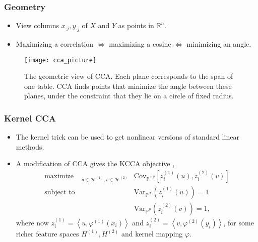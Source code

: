 \documentclass[10pt]{beamer}\usepackage[]{graphicx}\usepackage[]{color}
\def\reals{\mathbb{R}} %
\def\mrm#1{\mathrm{#1}}
\def\P{\mathbb{P}} %
\def\Cov{\mrm{Cov}} %
\def\Covsubarg#1#2{\Cov_{#1}\left[{#2}\right]}
\def\Var{\mrm{Var}}
\def\Varsubarg#1#2{\Var_{#1}\left(#2\right)}
\providecommand{\maximize}{\mathop\mathrm{maximize\quad}} %
\newcommand{\X}{\mathcal{X}}
\newcommand{\Y}{\mathcal{Y}}
\begin{document}
\begin{frame}
  \frametitle{Geometry}
  \begin{itemize}
  \item View columns $x_{\cdot j}, y_{\cdot j}$ of $X$ and $Y$ as points
    in $\reals^{n}$.
  \item Maximizing a correlation $\iff$ maximizing a cosine $\iff$ minimizing
    an angle.
  \end{itemize}
  \begin{figure}
    \texttt{[image: cca\_picture]}
    \caption{The geometric view of CCA. Each plane corresponds to the span of
      one table. CCA finds points that minimize the angle between these planes,
      under the constraint that they lie on a circle of fixed radius.}
  \end{figure}
\end{frame}

\begin{frame}
  \frametitle{Kernel CCA}
  \begin{itemize}
  \item The kernel trick can be used to get nonlinear versions of standard linear methods.
  \item A modification of CCA gives the KCCA objective \cite{yamanishi2003extraction},
    \begin{align}
      \maximize_{u \in \mathcal{H}^{(1)}, v \in \mathcal{H}^{(2)}}
      &\Covsubarg{\P^{\X\Y}}{z_{i}^{(1)}\left(u\right),
        z_{i}^{(2)}\left(v\right)} \label{eq:cancor_optim} \\
      \text{subject to } &\Varsubarg{\P^{\X}}{z_{i}^{(1)}\left(u\right)} = 1 \\
      &\Varsubarg{\P^{\Y}}{z_{i}^{(2)}\left(v\right)} = 1,
    \end{align}
    where now $z_{i}^{(1)} = \left<u, \varphi^{(1)}\left(x_{i}\right)\right>$
    and $z_{i}^{(2)} = \left<v, \varphi^{(2)}\left(y_{i}\right)\right>$, for some
    richer feature spaces $H^{(1)}, H^{(2)}$ and kernel mapping $\varphi$.
  \end{itemize}
\end{frame}
\end{document}
